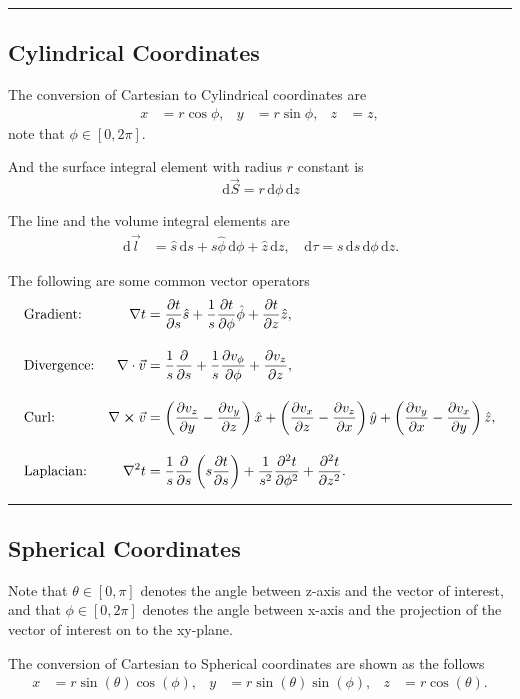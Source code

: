 \documentclass[a4paper]{article}
\newcommand{\dmr}[1]{\, \mathrm{d}#1} %
\numberwithin{equation}{subsection}
\begin{document}
\par\noindent\rule{\textwidth}{0.4pt}
\subsection{Cylindrical Coordinates}
The conversion of Cartesian to Cylindrical coordinates\cite{noauthor_cylindrical_2021} are 
\begin{align*}
    x &= r \cos \phi, & y &= r \sin\phi, & z &= z,
\end{align*}
note that $\phi \in [0,2\pi].$

And the surface integral element with radius $r$ constant is
\[
    \dmr{\vec{S}}    = r \dmr{\phi}\dmr{z}
\]    

The line and the volume integral elements are
\begin{align*}
    \dmr{\vec{l}} &= \hat{s}\dmr{s} + s\hat{\phi}\dmr{\phi}+\hat{z}\dmr{z}, & \dmr{\tau} = s\dmr{s}\dmr{\phi}\dmr{z}.
\end{align*}

The following are some common vector operators
\begin{align*}
    &\text{Gradient:} &\nabla t  &= \pdv{t}{s}\hat{s}+\frac{1}{s}\pdv{t}{\phi}\hat{\phi}+\pdv{t}{z}\hat{z},\\[1em]
    &\text{Divergence:} &\nabla\cdot\vec{v} &= \frac{1}{s}\pdv{}{s}(sv_s)+\frac{1}{s}\pdv{v_\phi}{\phi}+\pdv{v_z}{z},\\[1em]
    &\text{Curl:} &\nabla \cross \vec{v} &= \left(\pdv{v_z}{y}-\pdv{v_y}{z}\right)\hat{x} + \left(\pdv{v_x}{z}-\pdv{v_z}{x}\right)\hat{y} + \left(\pdv{v_y}{x}-\pdv{v_x}{y}\right)\hat{z},\\[1em]
    &\text{Laplacian:} &\laplacian t &= \frac{1}{s}\pdv{}{s}\left(s\pdv{t}{s}\right)+\frac{1}{s^2}\pdv[2]{t}{\phi}+\pdv[2]{t}{z}. 
\end{align*}
\par\noindent\rule{\textwidth}{0.4pt}

\subsection{Spherical Coordinates}
Note that $\theta\in[0,\pi]$ denotes the angle between z-axis and the vector of interest, and that $\phi\in[0, 2\pi]$ denotes the angle between x-axis and the projection of the vector of interest on to the xy-plane.\cite{noauthor_cylindrical_2021}

The conversion of Cartesian to Spherical coordinates are shown as the follows
\begin{align*}
    x &= r \sin(\theta)\cos(\phi), & y &= r \sin(\theta)\sin(\phi), & z &= r \cos(\theta).\\
\end{align*}
\end{document}
